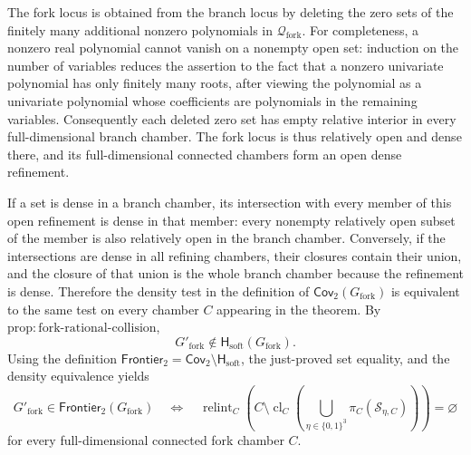 The fork locus is obtained from the branch locus by deleting the zero sets
of the finitely many additional nonzero polynomials in
\(\mathcal Q_{\mathrm{fork}}\).  For completeness, a nonzero real polynomial
cannot vanish on a nonempty open set: induction on the number of variables
reduces the assertion to the fact that a nonzero univariate polynomial has
only finitely many roots, after viewing the polynomial as a univariate
polynomial whose coefficients are polynomials in the remaining variables.
Consequently each deleted zero set has empty relative interior in every
full-dimensional branch chamber.  The fork locus is thus relatively open
and dense there, and its full-dimensional connected chambers form an open
dense refinement.

If a set is dense in a branch chamber, its intersection with every member
of this open refinement is dense in that member: every nonempty relatively
open subset of the member is also relatively open in the branch chamber.
Conversely, if the intersections are dense in all refining chambers, their
closures contain their union, and the closure of that union is the whole
branch chamber because the refinement is dense.  Therefore the density test
in the definition of \(\mathsf{Cov}_2(G_{\mathrm{fork}})\) is equivalent to
the same test on every chamber \(C\) appearing in the theorem.  By
\(\mathrm{prop:fork\text{-}rational\text{-}collision}\),
\[
 G'_{\mathrm{fork}}\notin
 \mathsf H_{\mathrm{soft}}(G_{\mathrm{fork}}).
\]
Using the definition
\(\mathsf{Frontier}_2=\mathsf{Cov}_2\setminus\mathsf H_{\mathrm{soft}}\),
the just-proved set equality, and the density equivalence yields
\[
 G'_{\mathrm{fork}}\in\mathsf{Frontier}_2(G_{\mathrm{fork}})
 \quad\Longleftrightarrow\quad
 \operatorname{relint}_C\!\left(
 C\setminus\operatorname{cl}_C
 \left(\bigcup_{\eta\in\{0,1\}^3}
 \pi_C(\mathscr S_{\eta,C})\right)
 \right)=\varnothing
\]
for every full-dimensional connected fork chamber \(C\).

